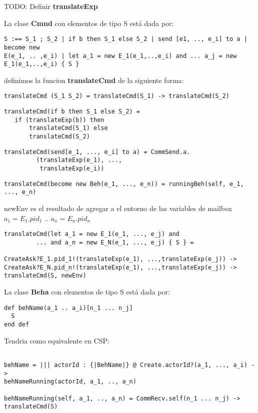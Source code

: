 TODO: Definir \textbf{translateExp}

La clase \textbf{Cmnd} con elementos de tipo S está dada por:

\begin{verbatim}
S :== S_1 ; S_2 | if b then S_1 else S_2 | send [e1, .., e_i] to a | become new
E(e_1, .. ,e_i) | let a_1 = new E_1(e_1,..,e_i) and ... a_j = new
E_1(e_1,..,e_i) { S } 
\end{verbatim}

definimos la funcion \textbf{translateCmd} de la siguiente forma:

\begin{verbatim}
translateCmd (S_1 S_2) = translateCmd(S_1) -> translateCmd(S_2)
\end{verbatim}


\begin{verbatim}
translateCmd(if b then S_1 else S_2) = 
   if (translateExp(b)) then
       translateCmd(S_1) else 
       translateCmd(S_2)
\end{verbatim}

\begin{verbatim}
translateCmd(send[e_1, ..., e_i] to a) = CommSend.a.
         (translateExp(e_1), ..., 
          translateExp(e_i)) 
\end{verbatim}

\begin{verbatim}
translateCmd(become new Beh(e_1, ..., e_n)) = runningBeh(self, e_1, ..., e_n)
\end{verbatim}

newEnv es el resultado de agregar a el entorno de las variables de mailbox $a_1
= E_1.pid_1$ .. $a_n = E_n.pid_n$
\begin{verbatim}
translateCmd(let a_1 = new E_1(e_1, ..., e_j) and 
         ... and a_n = new E_N(e_1, ..., e_j) { S } = 

CreateAsk?E_1.pid_1!(translateExp(e_1), ...,translateExp(e_j)) ->
CreateAsk?E_N.pid_n!(translateExp(e_1), ...,translateExp(e_j)) ->
translateCmd(S, newEnv)
\end{verbatim}


La clase \textbf{Beha} con elementos de tipo S está dada por:

\begin{verbatim}
def behName(a_1 .. a_i)[n_1 ... n_j]
  S
end def
\end{verbatim}

Tendria como equivalente en CSP:

\begin{verbatim}

behName = ||| actorId : {|BehName|} @ Create.actorId?(a_1, ..., a_i) ->
behNameRunning(actorId, a_1, .., a_n)

behNameRunning(self, a_1, .., a_n) = CommRecv.self(n_1 ... n_j) -> translateCmd(S)

\end{verbatim}
